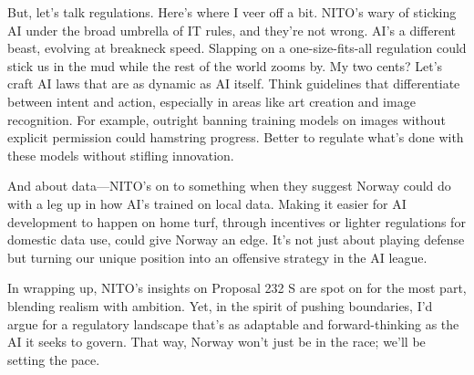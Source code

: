 \documentclass[12pt]{article}
\begin{document}
But, let's talk regulations. Here's where I veer off a bit. NITO's wary of sticking AI under the broad umbrella of IT rules, and they're not wrong. AI's a different beast, evolving at breakneck speed. Slapping on a one-size-fits-all regulation could stick us in the mud while the rest of the world zooms by. My two cents? Let's craft AI laws that are as dynamic as AI itself. Think guidelines that differentiate between intent and action, especially in areas like art creation and image recognition. For example, outright banning training models on images without explicit permission could hamstring progress. Better to regulate what's done with these models without stifling innovation.

And about data—NITO's on to something when they suggest Norway could do with a leg up in how AI's trained on local data. Making it easier for AI development to happen on home turf, through incentives or lighter regulations for domestic data use, could give Norway an edge. It's not just about playing defense but turning our unique position into an offensive strategy in the AI league.

In wrapping up, NITO's insights on Proposal 232 S are spot on for the most part, blending realism with ambition. Yet, in the spirit of pushing boundaries, I'd argue for a regulatory landscape that's as adaptable and forward-thinking as the AI it seeks to govern. That way, Norway won't just be in the race; we'll be setting the pace.


\end{document}
